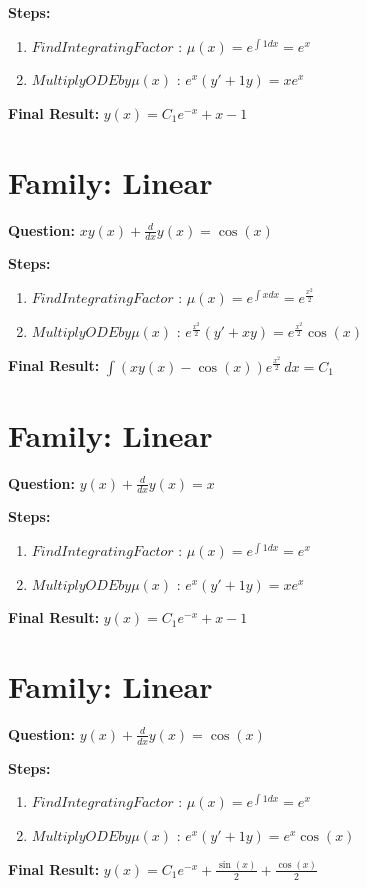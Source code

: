 \documentclass{article}
\begin{document}
\textbf{Steps:}
\begin{enumerate}
\item $Find Integrating Factor$ :  $\mu(x) = e^{\int 1 dx} = e^{x}$
\item $Multiply ODE by \mu(x)$ :  $e^{x}(y' + 1y) = x e^{x}$
\end{enumerate}
\textbf{Final Result:} $y{\left(x \right)} = C_{1} e^{- x} + x - 1$

\section*{Family: Linear}
\textbf{Question:} $x y{\left(x \right)} + \frac{d}{d x} y{\left(x \right)} = \cos{\left(x \right)}$

\textbf{Steps:}
\begin{enumerate}
\item $Find Integrating Factor$ :  $\mu(x) = e^{\int x dx} = e^{\frac{x^{2}}{2}}$
\item $Multiply ODE by \mu(x)$ :  $e^{\frac{x^{2}}{2}}(y' + xy) = e^{\frac{x^{2}}{2}} \cos{\left(x \right)}$
\end{enumerate}
\textbf{Final Result:} $\int \left(x y{\left(x \right)} - \cos{\left(x \right)}\right) e^{\frac{x^{2}}{2}}\, dx = C_{1}$

\section*{Family: Linear}
\textbf{Question:} $y{\left(x \right)} + \frac{d}{d x} y{\left(x \right)} = x$

\textbf{Steps:}
\begin{enumerate}
\item $Find Integrating Factor$ :  $\mu(x) = e^{\int 1 dx} = e^{x}$
\item $Multiply ODE by \mu(x)$ :  $e^{x}(y' + 1y) = x e^{x}$
\end{enumerate}
\textbf{Final Result:} $y{\left(x \right)} = C_{1} e^{- x} + x - 1$

\section*{Family: Linear}
\textbf{Question:} $y{\left(x \right)} + \frac{d}{d x} y{\left(x \right)} = \cos{\left(x \right)}$

\textbf{Steps:}
\begin{enumerate}
\item $Find Integrating Factor$ :  $\mu(x) = e^{\int 1 dx} = e^{x}$
\item $Multiply ODE by \mu(x)$ :  $e^{x}(y' + 1y) = e^{x} \cos{\left(x \right)}$
\end{enumerate}
\textbf{Final Result:} $y{\left(x \right)} = C_{1} e^{- x} + \frac{\sin{\left(x \right)}}{2} + \frac{\cos{\left(x \right)}}{2}$
\end{document}
